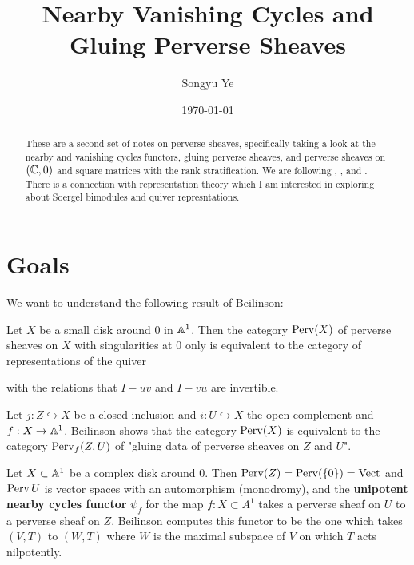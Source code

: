 \documentclass[12pt]{article}
\begin{document}
\rhead{\today}
\cfoot{\thepage}

\title{Nearby Vanishing Cycles and Gluing Perverse Sheaves}

\author{Songyu Ye}
\date{\today}
\maketitle


\begin{abstract}
These are a second set of notes on perverse sheaves, specifically taking a look at the nearby and vanishing cycles functors, gluing perverse sheaves, and 
perverse sheaves on $(\mathbb{C},0)$ and square matrices with the rank stratification. 
We are following \cite{beilinson}, \cite{reich}, and \cite{braden}. There
is a connection with representation theory which I am interested in 
exploring about Soergel bimodules and quiver represntations.

\end{abstract}
\tableofcontents

\section{Goals}
We want to understand the following result of Beilinson:

\begin{proposition}
Let $X$ be a small disk around $0$ in $\mathbb{A}^1$. Then the category $\operatorname{Perv}(X)$ 
of perverse sheaves on $X$ with singularities at $0$ only is equivalent to the 
category of representations of the quiver \begin{center}
\end{center} with the relations that $I - uv$ and $I - vu$ are invertible.
\end{proposition}
Let $j:Z \hookrightarrow X$ be a closed inclusion and $i:U \hookrightarrow X$ 
the open complement and $f:X\to \mathbb{A}^1$. Beilinson shows that the category $\operatorname{Perv}(X)$ is equivalent to
the category $\operatorname{Perv}_f(Z,U)$ of "gluing data of perverse sheaves on $Z$ and $U$".

\hfill

Let $X \subset \mathbb{A}^1$ be a complex disk around $0$. 
Then $\operatorname{Perv}(Z) = \operatorname{Perv}(\{0\}) = \operatorname{Vect}$ and $\operatorname{Perv}{U}$ is vector spaces 
with an automorphism (monodromy), and the \textbf{unipotent nearby cycles functor} $\psi_f$ 
for the map $f:X \subset A^1$ takes a perverse sheaf on $U$ to a perverse sheaf on $Z$.
Beilinson computes this functor to be the one which takes $(V,T)$ to $(W,T)$
where $W$ is the maximal subspace of $V$ on which $T$ acts nilpotently.
\end{document}
